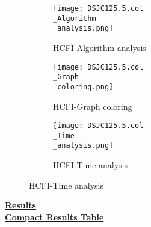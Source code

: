 \documentclass[10pt]{article}
\begin{document}
\graphicspath{{./Core1/Solutions/HCFI/DSJC125.5.col}}
\begin{figure}[H]
\begin{subfigure}{.33\textwidth}
  \centering
  \texttt{[image: DSJC125.5.col\\\_Algorithm\\\_analysis.png]}
  \caption{HCFI-Algorithm analysis}
   \label{fig:subfig1}
\end{subfigure}%
\begin{subfigure}{.33\textwidth}
  \centering
  \texttt{[image: DSJC125.5.col\\\_Graph\\\_coloring.png]}
  \caption{HCFI-Graph coloring}
  \label{fig:subfig2}
\end{subfigure}
\begin{subfigure}{.33\textwidth}
  \centering
  \texttt{[image: DSJC125.5.col\\\_Time\\\_analysis.png]}
  \caption{HCFI-Time analysis}
  \end{subfigure}
\end{figure}
\vspace{2cm}
\begin{center}
\hyperlink{page.8}{\textbf{Results}}\\
\vspace{0.5cm}
\hyperlink{page.71}{\textbf{Compact Results Table}}
\end{center}
\pagebreak
\end{document}
